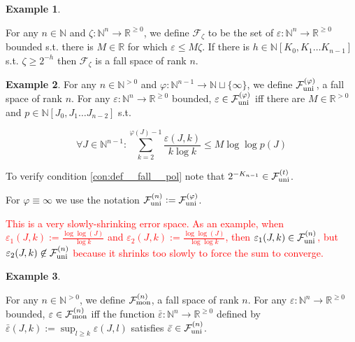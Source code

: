 \documentclass[11pt]{article}
\numberwithin{equation}{section}
\theoremstyle{definition}
\newtheorem{example}{Example}[section]
\theoremstyle{plain}
\newcommand{\Nats}{\mathbb{N}}
\newcommand{\Reals}{\mathbb{R}}
\newcommand{\NatPoly}{\Nats[K_0, K_1 \ldots K_{n-1}]}
\newcommand{\NatPolyJ}{\Nats[J_0, J_1 \ldots J_{n-2}]}
\newcommand{\NatFun}{\Nats^n \rightarrow}
\newcommand{\Fall}{\mathcal{F}}
\newcommand{\FallU}{{\Fall_{\textnormal{uni}}^{(n)}}}
\newcommand{\FallUt}[1]{{\Fall_{\textnormal{uni}}^{(#1)}}}
\newcommand{\FallM}{\Fall_{\textnormal{mon}}^{(n)}}
\begin{document}
\begin{samepage}
\begin{example}
\label{exm:fall_zeta}

For any ${n \in \Nats}$ and ${\zeta: \Nats^n \rightarrow \Reals^{\geq 0}}$, we define ${\Fall_{\zeta}}$ to be the set of ${\varepsilon: \NatFun \Reals^{\geq 0}}$ bounded s.t. there is ${M \in \Reals}$ for which ${\varepsilon \leq M \zeta}$. If there is ${h \in \NatPoly}$ s.t. ${\zeta \geq 2^{-h}}$ then ${\Fall_\zeta}$ is a fall space of rank ${n}$.

\end{example}
\end{samepage}

\begin{samepage}
\begin{example}
\label{exm:e_uni}
For any ${n \in \Nats^{>0}}$ and ${\varphi: \Nats^{n-1} \rightarrow \Nats \sqcup \{ \infty \}}$, we define ${\FallUt{\varphi}}$, a fall space of rank ${n}$. For any ${\varepsilon: \NatFun \Reals^{\geq 0}}$ bounded, $\varepsilon \in \FallUt{\varphi}$ iff there are ${M \in \Reals^{>0}}$ and ${p \in \NatPolyJ}$ s.t.

\begin{equation}
\forall J \in \Nats^{n-1}: \sum_{k=2}^{\varphi(J)-1}\frac{\varepsilon(J,k)}{k \log k} \leq M \log \log p(J)
\end{equation}

To verify condition \ref{con:def__fall__pol} note that ${2^{-K_{n-1}} \in \FallUt{t}}$.

For ${\varphi \equiv \infty}$ we use the notation ${\FallU:=\FallUt{\varphi}}$.

\textcolor{red}{This is a very slowly-shrinking error space. As an example, when $\varepsilon_{1}(J,k):=\frac{\log\log(J)}{\log k}$ and $\varepsilon_{2}(J,k):=\frac{\log\log(J)}{\log\log k}$, then $\varepsilon_{1}(J,k)\in\FallU$, but $\varepsilon_{2}(J,k)\not\in\FallU$ because it shrinks too slowly to force the sum to converge.}

\end{example}
\end{samepage}

\begin{samepage}
\begin{example}
\label{exm:e_mon}

For any ${n \in \Nats^{>0}}$, we define ${\FallM}$, a fall space of rank ${n}$. For any ${\varepsilon: \NatFun \Reals^{\geq 0}}$ bounded, $\varepsilon \in \FallM$ iff the function ${\bar{\varepsilon}: \NatFun \Reals^{\geq 0}}$ defined by ${\bar{\varepsilon}(J,k):=\sup_{l \geq k} \varepsilon(J,l)}$ satisfies ${\bar{\varepsilon} \in \FallU}$.

\end{example}
\end{samepage}
\end{document}
